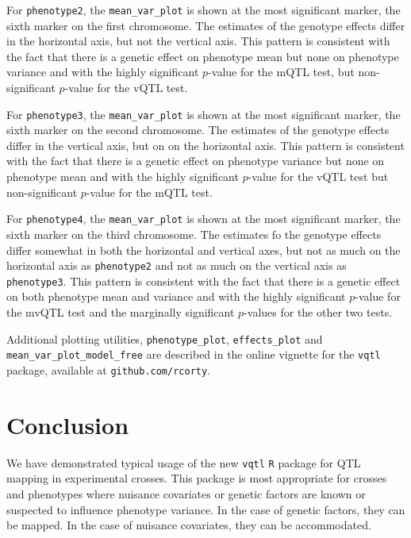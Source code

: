 \documentclass[9pt,twocolumn,twoside]{gsag3jnl}
\begin{document}
For \texttt{phenotype2}, the \texttt{mean\_var\_plot} is shown at the most significant marker, the sixth marker on the first chromosome.
The estimates of the genotype effects differ in the horizontal axis, but not the vertical axis.
This pattern is consistent with the fact that there is a genetic effect on phenotype mean but none on phenotype variance and with the highly significant $p$-value for the mQTL test, but non-significant $p$-value for the vQTL test.

For \texttt{phenotype3}, the \texttt{mean\_var\_plot} is shown at the most significant marker, the sixth marker on the second chromosome.
The estimates of the genotype effects differ in the vertical axis, but on on the horizontal axis.
This pattern is consistent with the fact that there is a genetic effect on phenotype variance but none on phenotype mean and with the highly significant $p$-value for the vQTL test but non-significant $p$-value for the mQTL test.

For \texttt{phenotype4}, the \texttt{mean\_var\_plot} is shown at the most significant marker, the sixth marker on the third chromosome.
The estimates fo the genotype effects differ somewhat in both the horizontal and vertical axes, but not as much on the horizontal axis as \texttt{phenotype2} and not as much on the vertical axis as \texttt{phenotype3}.
This pattern is consistent with the fact that there is a genetic effect on both phenotype mean and variance and with the highly significant $p$-value for the mvQTL test and the marginally significant $p$-values for the other two tests.

Additional plotting utilities, \texttt{phenotype\_plot}, \texttt{effects\_plot} and \texttt{mean\_var\_plot\_model\_free} are described in the online vignette for the \texttt{vqtl} package, available at \texttt{github.com/rcorty}.




\section*{Conclusion}

We have demonstrated typical usage of the new \texttt{vqtl} \texttt{R} package for QTL mapping in experimental crosses.
This package is most appropriate for crosses and phenotypes where nuisance covariates or genetic factors are known or suspected to influence phenotype variance.
In the case of genetic factors, they can be mapped.
In the case of nuisance covariates, they can be accommodated.
\end{document}
